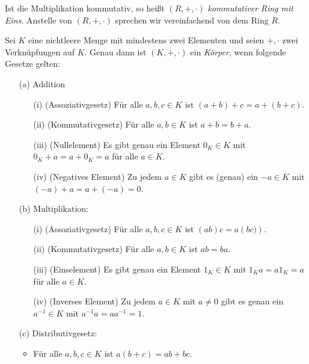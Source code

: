 \begin{bem} %
Ist die Multiplikation kommutativ, so heißt $\left(R, +, \cdot\right)$ \textit{kommutativer Ring mit Eins}. Anstelle von $\left(R, +, \cdot\right)$ sprechen wir vereinfachend von dem Ring $R$.
\end{bem}
%
%
\begin{defn}
Sei $K$ eine nichtleere Menge mit mindestens zwei Elementen und seien $+, \cdot$ zwei Verknüpfungen auf $K$. Genau dann ist $\left(K, +, \cdot\right)$ ein \textit{Körper}, wenn folgende Gesetze gelten:
\begin{enumerate}
\item[(a)] Addition
\begin{enumerate}
\item[(i)] (Assoziativgesetz) Für alle $a, b, c \in K$ ist $\left(a + b \right) + c = a + \left(b +c\right)$.
\item[(ii)] (Kommutativgesetz) Für alle $a, b \in K$ ist $a+b = b + a$.
\item[(iii)] (Nullelement) Es gibt genau ein Element $0_K \in K$ mit $0_K + a = a + 0_K = a$ für alle $a \in K$.
\item[(iv)] (Negatives Element) Zu jedem $a \in K$ gibt es (genau) ein $-a \in K$ mit $\left(-a\right)+ a = a + \left(-a\right)= 0$.
\end{enumerate} 
\item[(b)] Multiplikation:
\begin{enumerate}
\item[(i)] (Assoziativgesetz) Für alle $a, b, c \in K$ ist $\left(ab\right)c = a\left(bc)\right)$.
\item[(ii)] (Kommutativgesetz) Für alle $a, b \in K$ ist $ab = ba$.
\item[(iii)] (Einselement) Es gibt genau ein Element $1_K \in K$ mit $1_K a = a 1_K = a$ für alle $a \in K$.
\item[(iv)] (Inverses Element) Zu jedem $a \in K$ mit $a\neq 0 $ gibt es genau ein $a^{-1} \in K$ mit $a^{-1} a = a a^{-1} = 1$.
\end{enumerate}
\item[(c)] Distributivgesetz:
\begin{itemize}
\item Für alle $a, b, c \in K$ ist $a\left(b +c\right) = ab + bc$.
\end{itemize}
\end{enumerate}
\end{defn}



